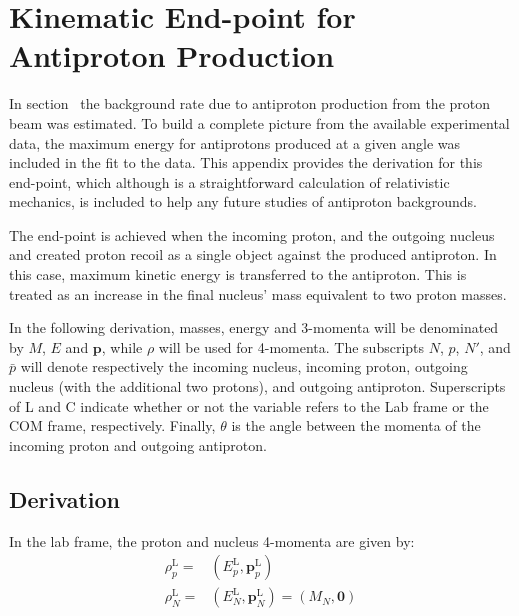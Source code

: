 \chapter{Kinematic End-point for Antiproton Production}
In section~ the background rate due to antiproton production from the proton beam was estimated.
To build a complete picture from the available experimental data, the maximum energy for antiprotons produced at a given angle was included in the fit to the data.
This appendix provides the derivation for this end-point, which although is a straightforward calculation of relativistic mechanics, is included to help any future studies of antiproton backgrounds.

The end-point is achieved when the incoming proton, and the outgoing nucleus and created proton recoil as a single object against the produced antiproton.
In this case, maximum kinetic energy is transferred to the antiproton.
This is treated as an increase in the final nucleus' mass equivalent to two proton masses.

\renewcommand{\vec}[1]{\mathbf{#1}}
In the following derivation, masses, energy and 3-momenta will be denominated by $M$, $E$ and $\vec{p}$, while $\rho$ will be used for 4-momenta.
The subscripts $N$, $p$, $N'$, and $\bar{p}$ will denote respectively the incoming nucleus, incoming proton, outgoing nucleus (with the additional two protons), and outgoing antiproton.
Superscripts of L and C indicate whether or not the variable refers to the Lab frame or the \ac{COM} frame, respectively.
Finally, $\theta$ is the angle between the momenta of the incoming proton and outgoing antiproton.

\section{Derivation}
\newcommand{\lab}{\ensuremath{\textrm{L}\xspace}}
\newcommand{\com}{\ensuremath{\textrm{C}\xspace}}
In the lab frame, the proton and nucleus 4-momenta are given by:
\begin{align}
\rho_p^\lab=&(E^\lab_p,\vec{p}^\lab_p)\\
\rho_N^\lab=&(E^\lab_N,\vec{p}^\lab_N)=(M_N,\vec{0})
\end{align}

